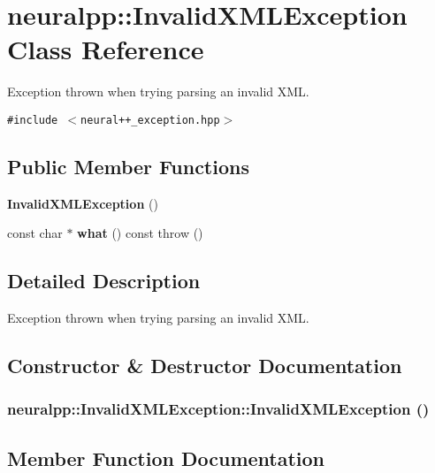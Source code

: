 \section{neuralpp::InvalidXMLException Class Reference}
\label{classneuralpp_1_1InvalidXMLException}
Exception thrown when trying parsing an invalid XML.  


{\tt \#include $<$neural++\_\-exception.hpp$>$}

\subsection*{Public Member Functions}
\begin{CompactItemize}
\item 
{\bf InvalidXMLException} ()
\item 
const char $\ast$ {\bf what} () const   throw ()
\end{CompactItemize}


\subsection{Detailed Description}
Exception thrown when trying parsing an invalid XML. 

\subsection{Constructor \& Destructor Documentation}
\subsubsection[InvalidXMLException]{\setlength{\rightskip}{0pt plus 5cm}neuralpp::InvalidXMLException::InvalidXMLException ()\hspace{0.3cm}{\tt  [inline]}}\label{classneuralpp_1_1InvalidXMLException_10279e6f42a1ccb934afcfef2770c537}




\subsection{Member Function Documentation}
